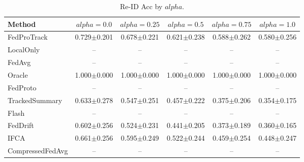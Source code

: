 \begin{table}[t]
\centering
\caption{Re-ID Acc by $alpha$.}
\label{tab:alpha_concept_re_id_accuracy}
\begin{tabular}{lccccc}
\toprule
Method & $alpha=0.0$ & $alpha=0.25$ & $alpha=0.5$ & $alpha=0.75$ & $alpha=1.0$ \\
\midrule
FedProTrack & 0.729$\pm$0.201 & 0.678$\pm$0.221 & 0.621$\pm$0.238 & 0.588$\pm$0.262 & 0.580$\pm$0.256 \\
LocalOnly & -- & -- & -- & -- & -- \\
FedAvg & -- & -- & -- & -- & -- \\
Oracle & 1.000$\pm$0.000 & 1.000$\pm$0.000 & 1.000$\pm$0.000 & 1.000$\pm$0.000 & 1.000$\pm$0.000 \\
FedProto & -- & -- & -- & -- & -- \\
TrackedSummary & 0.633$\pm$0.278 & 0.547$\pm$0.251 & 0.457$\pm$0.222 & 0.375$\pm$0.206 & 0.354$\pm$0.175 \\
Flash & -- & -- & -- & -- & -- \\
FedDrift & 0.602$\pm$0.256 & 0.524$\pm$0.231 & 0.441$\pm$0.205 & 0.373$\pm$0.189 & 0.360$\pm$0.165 \\
IFCA & 0.661$\pm$0.256 & 0.595$\pm$0.249 & 0.522$\pm$0.244 & 0.459$\pm$0.254 & 0.448$\pm$0.247 \\
CompressedFedAvg & -- & -- & -- & -- & -- \\
\bottomrule
\end{tabular}
\end{table}